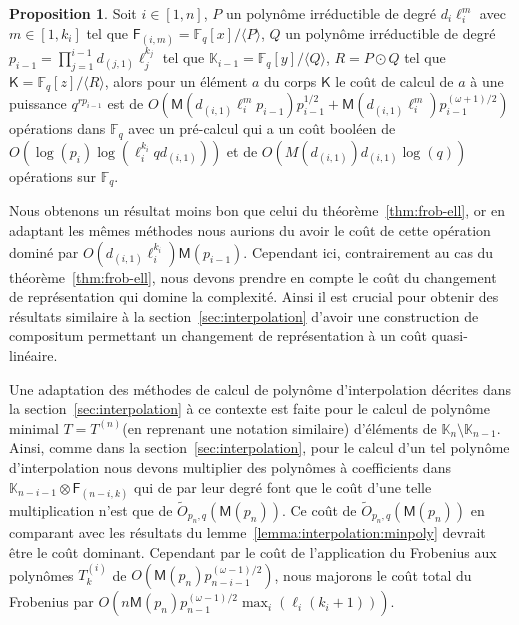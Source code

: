 \documentclass[10pt,a4paper]{book}
\theoremstyle{plain}
\theoremstyle{definition}
\theoremstyle{definition}
\theoremstyle{definition}
\theoremstyle{definition}
\newtheorem{prop}[thm]{Proposition}
\theoremstyle{definition}
\theoremstyle{remark}
\theoremstyle{remark}
\theoremstyle{definition}
\begin{document}
\begin{prop}
\label{pro:fro:com}
Soit $i \in [1,n]$, $P$ un polynôme irréductible de degré $d_i\ell_i^{m}$ avec 
$m \in [1,k_i]$ tel que $\mathsf{F}_{(i,m)}=\mathbb{F}_q[x]/\langle P \rangle$,
$Q$ un polynôme irréductible de degré $p_{i-1}=\prod_{j=1}^{i-1}d_{(j,1)}\ell_j^{k_j}$
tel que $\mathbb{K}_{i-1}=\mathbb{F}_q[y]/\langle Q \rangle$, $R=P \odot Q$ 
tel que  $\mathsf{K}=\mathbb{F}_q[z]/\langle R\rangle$, alors pour un 
élément $a$ du corps $\mathsf{K}$ le coût de calcul de $a$ à une puissance 
$q^{r p_{i-1}}$ est de 
$O(\mathsf{M}(d_{(i,1)}\ell_i^{m}p_{i-1})p_{i-1}^{1/2}+\mathsf{M}(d_{(i,1)}\ell_i^{m})p_{i-1}^{(\omega+1)/2})$ 
opérations dans $\mathbb{F}_q$ avec un 
pré-calcul qui a un coût booléen de $O(\log(p_{i})\log(\ell_i^{k_i}qd_{(i,1)}))$ et  
de $O( M(d_{(i,1)}) d_{(i,1)}\log(q))$ opérations sur $\mathbb{F}_q$.
\end{prop}

 
Nous obtenons un résultat moins bon que celui du théorème~\ref{thm:frob-ell}, 
or en adaptant les mêmes méthodes nous aurions du avoir le coût de cette 
opération dominé par $O(d_{(i,1)}\ell_i^{k_i})\mathsf{M}(p_{i-1})$. 
Cependant ici, contrairement au cas du théorème~\ref{thm:frob-ell}, nous devons
prendre en compte le coût du changement de représentation qui domine la 
complexité. Ainsi il est crucial pour obtenir des résultats similaire à la 
section~\ref{sec:interpolation} d'avoir une construction de compositum 
permettant un changement de représentation à un coût quasi-linéaire.

Une adaptation des méthodes de calcul de polynôme d'interpolation décrites dans
la section~\ref{sec:interpolation} à ce contexte est faite pour le calcul de 
polynôme minimal $T=T^{(n)}$(en reprenant une notation similaire) d'éléments de 
$\mathbb{K}_n \setminus \mathbb{K}_{n-1}$.
Ainsi, comme dans la section~\ref{sec:interpolation}, 
pour le calcul d'un tel polynôme d'interpolation nous devons 
multiplier des polynômes à coefficients dans $\mathbb{K}_{n-i-1} \otimes 
\mathsf{F}_{(n-i,k)}$ qui de par leur degré font que le coût d'une telle 
multiplication n'est que de $\tilde{O}_{p_n,q}(\mathsf{M}(p_n))$. Ce coût de 
$\tilde{O}_{p_n,q}(\mathsf{M}(p_n))$ en comparant 
avec les résultats du lemme~\ref{lemma:interpolation:minpoly} devrait être le 
coût dominant. Cependant par le coût de 
l'application du Frobenius aux polynômes $T^{(i)}_k$ de $O(\mathsf{M}
(p_n)p_{n-i-1}^{(\omega-1)/2})$, nous majorons le coût total du Frobenius par 
$O(n\mathsf{M}(p_n)p_{n-1}^{(\omega-1)/2}\max_i(\ell_{i}(k_{i}+1)))$. %
\end{document}
